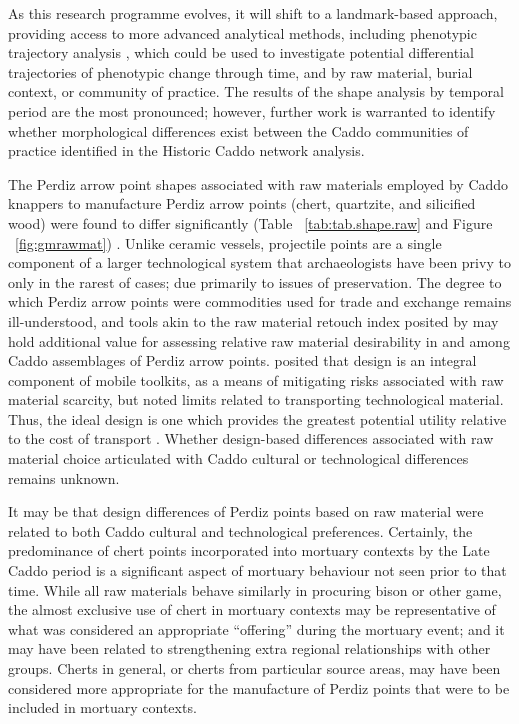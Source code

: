 \documentclass[review]{elsarticle}
\begin{document}
As this research programme evolves, it will shift to a landmark-based approach, providing access to more advanced analytical methods, including phenotypic trajectory analysis \citep{RN8352,RN8561,RN8544,RN8560}, which could be used to investigate potential differential trajectories of phenotypic change through time, and by raw material, burial context, or community of practice. The results of the shape analysis by temporal period are the most pronounced; however, further work is warranted to identify whether morphological differences exist between the Caddo communities of practice identified in the Historic Caddo network analysis.

The Perdiz arrow point shapes associated with raw materials employed by Caddo knappers to manufacture Perdiz arrow points (chert, quartzite, and silicified wood) were found to differ significantly (Table ~\ref{tab:tab.shape.raw} and Figure ~\ref{fig:gmrawmat}) \citep{RN8980}. Unlike ceramic vessels, projectile points are a single component of a larger technological system that archaeologists have been privy to only in the rarest of cases; due primarily to issues of preservation. The degree to which Perdiz arrow points were commodities used for trade and exchange remains ill-understood, and tools akin to the raw material retouch index posited by \citet{RN6541} may hold additional value for assessing relative raw material desirability in and among Caddo assemblages of Perdiz arrow points. \citet{RN6363} posited that design is an integral component of mobile toolkits, as a means of mitigating risks associated with raw material scarcity, but noted limits related to transporting technological material. Thus, the ideal design is one which provides the greatest potential utility relative to the cost of transport \citep{RN6363}. Whether design-based differences associated with raw material choice articulated with Caddo cultural or technological differences remains unknown.

It may be that design differences of Perdiz points based on raw material were related to both Caddo cultural and technological preferences. Certainly, the predominance of chert points incorporated into mortuary contexts by the Late Caddo period is a significant aspect of mortuary behaviour not seen prior to that time. While all raw materials behave similarly in procuring bison or other game, the almost exclusive use of chert in mortuary contexts may be representative of what was considered an appropriate “offering” during the mortuary event; and it may have been related to strengthening extra regional relationships with other groups. Cherts in general, or cherts from particular source areas, may have been considered more appropriate for the manufacture of Perdiz points that were to be included in mortuary contexts.
\end{document}
